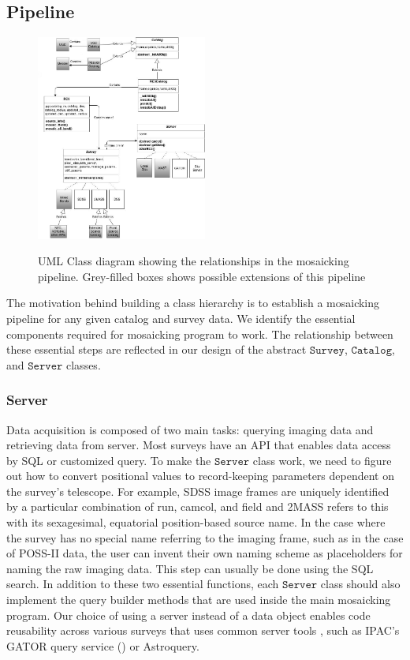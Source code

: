 \documentclass[5p]{elsarticle}
\begin{document}
	\subsection{Pipeline}
	\begin{figure}[h]
		\includegraphics[width=0.5\textwidth]{figures/hierarchy}
		\label{fig:hierarchy}
		\caption{UML Class diagram showing the relationships in the mosaicking pipeline. Grey-filled boxes shows possible extensions of this pipeline}
	\end{figure}
 	The motivation behind building a class hierarchy is to establish a mosaicking pipeline for any given catalog and survey data. We identify the essential components required for mosaicking program to work. The relationship between these essential steps are reflected in our design of the abstract $\texttt{Survey}$, $\texttt{Catalog}$, and $\texttt{Server}$ classes. 
 		\subsubsection{Server}
		Data acquisition is composed of two main tasks: querying imaging data and retrieving data from server. Most surveys have an API that enables data access by SQL or customized query. To make the $\texttt{Server}$ class work, we need to figure out how to convert positional values to record-keeping parameters dependent on the survey's telescope. For example, SDSS image frames are uniquely identified by a particular combination of  run, camcol, and field and 2MASS refers to this with its sexagesimal, equatorial position-based source name. In the case where the survey has no special name referring to the imaging frame, such as in the case of POSS-II data, the user can invent their own naming scheme as placeholders for naming the raw imaging data. This step can usually be done using the SQL search. In addition to these two essential functions, each $\texttt{Server}$ class should also implement the query builder methods that are used inside the main mosaicking program.  Our choice of using a server instead of a data object enables code reusability across various surveys that uses common server tools , such as IPAC's GATOR query service (\citet{irsa}) or  Astroquery.
\end{document}
